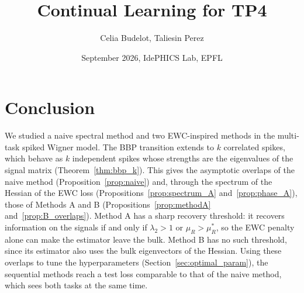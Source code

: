 \documentclass[11pt]{article}
\title{\bf Continual Learning for TP4}
\author{Celia Budelot, Taliesin Perez}
\date{September 2026, IdePHICS Lab, EPFL}
\begin{document}
\maketitle






















\section{Conclusion}\label{sec:conclusion}
We studied a naive spectral method and two EWC-inspired methods in the multi-task spiked Wigner model. The BBP transition extends to $k$ correlated spikes, which behave as $k$ independent spikes whose strengths are the eigenvalues of the signal matrix (Theorem~\ref{thm:bbp_k}). This gives the asymptotic overlaps of the naive method (Proposition~\ref{prop:naive}) and, through the spectrum of the Hessian of the EWC loss (Propositions~\ref{prop:spectrum_A} and~\ref{prop:phase_A}), those of Methods A and B (Propositions~\ref{prop:methodA} and~\ref{prop:B_overlaps}). Method A has a sharp recovery threshold: it recovers information on the signals if and only if $\lambda_2 > 1$ or $\mu_R > \mu_R^*$, so the EWC penalty alone can make the estimator leave the bulk. Method B has no such threshold, since its estimator also uses the bulk eigenvectors of the Hessian. Using these overlaps to tune the hyperparameters (Section~\ref{sec:optimal_param}), the sequential methods reach a test loss comparable to that of the naive method, which sees both tasks at the same time.



\newpage





\newpage
\appendix

\end{document}
